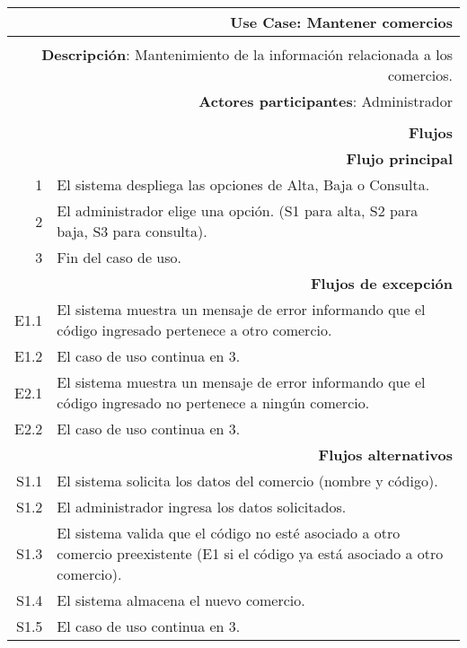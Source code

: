 \begin{tabularx}{\textwidth}{| r | X |}
\hline
\multicolumn{2}{|X|}{
\textbf{Use Case}: Mantener comercios} \\

\hline
\multicolumn{2}{|c|}{\cellcolor[gray]{0.6}} \\

\hline
\multicolumn{2}{|X|}{
\textbf{Descripción}: Mantenimiento de la información relacionada a los
comercios.} \\

\hline
\multicolumn{2}{|X|}{
\textbf{Actores participantes}: Administrador} \\

\hline
\multicolumn{2}{|c|}{\cellcolor[gray]{0.6} } \\

\hline
\multicolumn{2}{|X|}{
\textbf{Flujos}} \\

\hline
\multicolumn{2}{|X|}{
\textbf{Flujo principal}} \\

\hline
1 & El sistema despliega las opciones de Alta, Baja o Consulta. \\
\hline
2 & El administrador elige una opción. (S1 para alta, S2 para baja, S3 para
consulta). \\
\hline
3 & Fin del caso de uso. \\

\hline
\multicolumn{2}{|X|}{
\textbf{Flujos de excepción}} \\

\hline
E1.1 & El sistema muestra un mensaje de error informando que el código
ingresado pertenece a otro comercio. \\
\hline
E1.2 & El caso de uso continua en 3. \\

\hline
E2.1 & El sistema muestra un mensaje de error informando que el código
ingresado no pertenece a ningún comercio. \\
\hline
E2.2 & El caso de uso continua en 3. \\

\hline
\multicolumn{2}{|X|}{
\textbf{Flujos alternativos}} \\

\hline
S1.1 & El sistema solicita los datos del comercio (nombre y código). \\
\hline
S1.2 & El administrador ingresa los datos solicitados. \\
\hline
S1.3 & El sistema valida que el código no esté asociado a otro comercio
preexistente (E1 si el código ya está asociado a otro comercio). \\
\hline
S1.4 & El sistema almacena el nuevo comercio. \\
\hline
S1.5 & El caso de uso continua en 3. \\


\end{tabularx}
